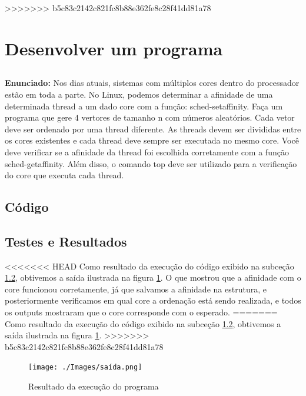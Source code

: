 \documentclass{article}
\begin{document}
>>>>>>> b5c83c2142c821fc8b88e362fe8c28f41dd81a78

\section{Desenvolver um programa}

\subsection{}
\textbf{Enunciado:} Nos dias atuais, sistemas com múltiplos cores dentro do processador estão em toda a parte. No Linux, podemos determinar a afinidade de uma determinada thread a um dado core com a função: sched-setaffinity. Faça um programa que gere 4 vertores de tamanho n com números aleatórios. Cada vetor deve ser ordenado por uma thread diferente. As threads devem ser divididas entre os cores existentes e cada thread deve sempre ser executada no mesmo core. Você deve verificar se a afinidade da thread foi escolhida corretamente com a função sched-getaffinity. Além disso, o comando top deve ser utilizado para a verificação do core que executa cada thread. \newline

\subsection{Código}
\label{sub-sec-cod}


\subsection{Testes e Resultados}
<<<<<<< HEAD
Como resultado da execução do código exibido na subceção \ref{sub-sec-cod}, obtivemos a saída ilustrada na figura \ref{fig:exec}. O que mostrou que a afinidade com o core funcionou corretamente, já que salvamos a afinidade na estrutura, e posteriormente verificamos em qual core a ordenação está sendo realizada, e todos os outputs mostraram que o core corresponde com o esperado.
=======
Como resultado da execução do código exibido na subceção \ref{sub-sec-cod}, obtivemos a saída ilustrada na figura \ref{fig:exec}.
>>>>>>> b5c83c2142c821fc8b88e362fe8c28f41dd81a78

\begin{figure}[ht]
    \centering
    \texttt{[image: ./Images/saída.png]}
    \caption{Resultado da execução do programa}
    \label{fig:exec}
\end{figure}

\printbibliography %
\end{document}
